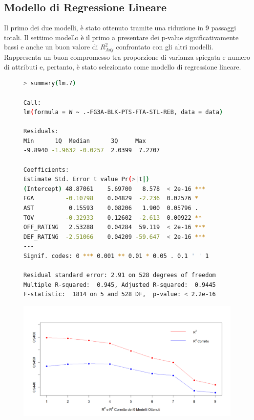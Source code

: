 \documentclass[11pt,a4paper]{article}
\begin{document}
\subsection{Modello di Regressione Lineare}
Il primo dei due modelli, è stato ottenuto tramite una riduzione in 9 passaggi totali.
Il settimo modello è il primo a presentare dei p-value significativamente bassi e anche un buon valore di $R^2_{Adj}$ confrontato con gli altri modelli. Rappresenta un buon compromesso tra proporzione di varianza spiegata e numero di attributi e, pertanto, è stato selezionato come modello di regressione lineare.

\begin{figure}[h]
	\hspace{-2.30cm}
	\begin{minipage}{.57\textwidth} 
		\begin{lstlisting}[language=bash,basicstyle=\tiny,tabsize=2,frame = single]
> summary(lm.7)
            
Call:
lm(formula = W ~ .-FG3A-BLK-PTS-FTA-STL-REB, data = data)
            
Residuals:
Min      1Q  Median      3Q     Max 
-9.8940 -1.9632 -0.0257  2.0399  7.2707 
            
Coefficients:
Estimate Std. Error t value Pr(>|t|)    
(Intercept) 48.87061    5.69700   8.578  < 2e-16 ***
FGA         -0.10798    0.04829  -2.236  0.02576 *  
AST          0.15593    0.08206   1.900  0.05796 .  
TOV         -0.32933    0.12602  -2.613  0.00922 ** 
OFF_RATING   2.53288    0.04284  59.119  < 2e-16 ***
DEF_RATING  -2.51066    0.04209 -59.647  < 2e-16 ***
---
Signif. codes: 0 *** 0.001 ** 0.01 * 0.05 . 0.1 ' ' 1
            
Residual standard error: 2.91 on 528 degrees of freedom
Multiple R-squared:  0.945,	Adjusted R-squared:  0.9445 
F-statistic:  1814 on 5 and 528 DF,  p-value: < 2.2e-16
    \end{lstlisting}
\end{minipage}
	\begin{minipage}{0.5\textwidth} 
		\includegraphics[scale=.45]{imgs/r2_linear_model.png}
	\end{minipage}
\end{figure}
\end{document}
